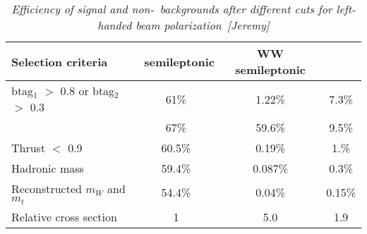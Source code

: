         \begin{table}[H]
        \begin{center}
        \begin{tabular}{l c c c}
        \hline
	Selection criteria & \ttbar\ semileptonic  & WW semileptonic &  \bbbar  \\
	\hline

	btag$_1$ $>$ 0.8 or btag$_2$ $>$ 0.3 & 61\% & 1.22\% & 7.3\% \\
	 & 67\% & 59.6\% & 9.5\% \\
	Thrust $<$ 0.9 & 60.5\% & 0.19\% & 1.\% \\
	Hadronic mass & 59.4\% & 0.087\% & 0.3\% \\
	Reconstructed $m_W$ and $m_t$ & 54.4\% & 0.04\% & 0.15\% \\
		\hline
	Relative cross section & 1 & 5.0 & 1.9 \\
        \hline
        \end{tabular}
        \end{center}
        \caption{\sl Efficiency of signal and non-\ttbar\ backgrounds after different cuts for left-handed beam polarization~[Jeremy]}
        \label{table:ttbarselection}
        \end{table}
